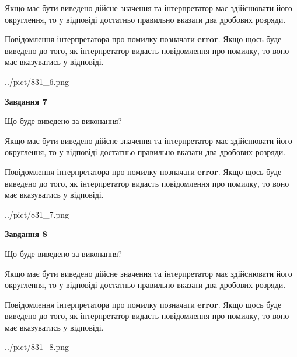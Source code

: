 \documentclass[12pt, ukrainian]{article}
\begin{document}
{\begin {Large}
Якщо має бути виведено дійсне значення та інтерпретатор має здійснювати його округлення, 
то у відповіді достатньо правильно вказати два дробових розряди.

Повідомлення інтерпретатора про помилку позначати \textbf{error}.
Якщо щось буде виведено до того, як інтерпретатор видасть повідомлення про помилку, 
то воно має вказуватись у відповіді. \par

\begin{center}
	{../pict/831_6.png}
\end{center}
\newpage

{\begin {center}\textbf{Завдання 7}\end {center}}\par
Що буде виведено за виконання? \par

Якщо має бути виведено дійсне значення та інтерпретатор має здійснювати його округлення, 
то у відповіді достатньо правильно вказати два дробових розряди.

Повідомлення інтерпретатора про помилку позначати \textbf{error}.
Якщо щось буде виведено до того, як інтерпретатор видасть повідомлення про помилку, 
то воно має вказуватись у відповіді. \par

\begin{center}
	{../pict/831_7.png}
\end{center}
\newpage

{\begin {center}\textbf{Завдання 8}\end {center}}\par
Що буде виведено за виконання? \par

Якщо має бути виведено дійсне значення та інтерпретатор має здійснювати його округлення, 
то у відповіді достатньо правильно вказати два дробових розряди.

Повідомлення інтерпретатора про помилку позначати \textbf{error}.
Якщо щось буде виведено до того, як інтерпретатор видасть повідомлення про помилку, 
то воно має вказуватись у відповіді. \par

\begin{center}
	{../pict/831_8.png}
\end{center}
\newpage


\end{Large}}
\end{document}
